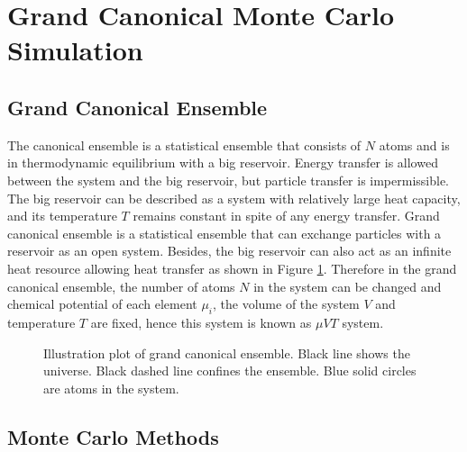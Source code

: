 \section{Grand Canonical Monte Carlo Simulation}
\label{Chap:Mech:GCMC}

\subsection{Grand Canonical Ensemble}

The canonical ensemble is a statistical ensemble that consists of $N$ atoms and is in thermodynamic equilibrium with a big reservoir. Energy transfer is allowed between the system and the big reservoir, but particle transfer is impermissible. The big reservoir can be described as a system with relatively large heat capacity, and its temperature $T$ remains constant in spite of any energy transfer. Grand canonical ensemble is a statistical ensemble that can exchange particles with a reservoir as an open system. Besides, the big reservoir can also act as an infinite heat resource allowing heat transfer as shown in Figure \ref{Chap:Meth:GCMC:fig1}. \cite{frenkel2001understanding} Therefore in the grand canonical ensemble, the number of atoms $N$ in the system can be changed and chemical potential of each element $\mu_i$, the volume of the system $V$ and temperature $T$ are fixed, hence this system is known as $\mu VT$ system.

\begingroup
\begin{figure}[!ht]
  \centering
  \caption[Illustration plot of grand canonical ensemble.]{Illustration plot of grand canonical ensemble. Black line shows the universe. Black dashed line confines the ensemble. Blue solid circles are atoms in the system.}
  \label{Chap:Meth:GCMC:fig1}
\end{figure}
\endgroup

\subsection{Monte Carlo Methods}
\label{Chap:Mech:GCMC:MC}

